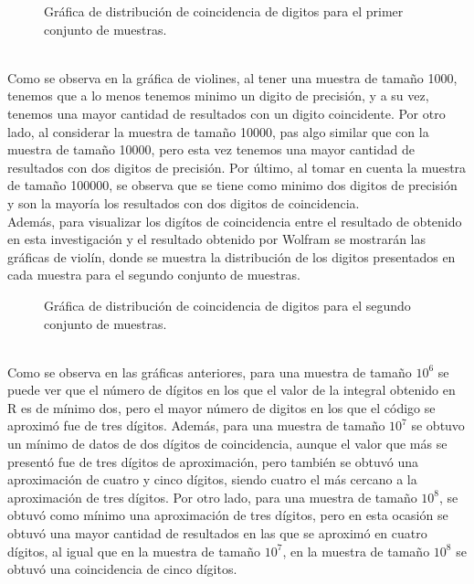 \documentclass{report}
\begin{document}
\newpage

\begin{figure}[htpb]
\centering
{}
\caption{Gráfica de distribución de coincidencia de digitos para el primer conjunto de muestras.}
\end{figure} \\

\noindent Como se observa en la gráfica de violines, al tener una muestra  de tamaño 1000, tenemos que a lo menos tenemos minimo un digito de precisión, y a su vez, tenemos una mayor cantidad de resultados con un digito coincidente. Por otro lado, al considerar la muestra de tamaño 10000, pas algo similar que con la muestra de tamaño 10000, pero esta vez tenemos una mayor cantidad de resultados con dos digitos de precisión. Por último, al tomar en cuenta la muestra de tamaño 100000, se observa que se tiene como minimo dos digitos de precisión y son la mayoría los resultados con dos digitos de coincidencia. \\

\noindent Además, para visualizar los digítos de coincidencia entre el resultado de obtenido en esta investigación y el resultado obtenido por Wolfram se mostrarán las gráficas de violín, donde se muestra la distribución de los digitos presentados en cada muestra para el segundo conjunto de muestras. \\

\newpage

\begin{figure}[htpb]
\centering
{}
\caption{Gráfica de distribución de coincidencia de digitos para el segundo conjunto de muestras.}
\end{figure} \\

\noindent Como se observa en las gráficas anteriores, para una muestra de tamaño $10^{6}$ se puede ver que el número de dígitos en los que el valor de la integral obtenido en R es de mínimo dos, pero el mayor número de digitos en los que el código se aproximó fue de tres dígitos. Además, para una muestra de tamaño $10^{7}$ se obtuvo un mínimo de datos de dos dígitos de coincidencia, aunque el valor que más se presentó fue de tres dígitos de aproximación, pero también se obtuvó una aproximación de cuatro y cinco dígitos, siendo cuatro el más cercano a la aproximación de tres dígitos. Por otro lado, para una muestra de tamaño $10^{8}$, se obtuvó como mínimo una aproximación de tres dígitos, pero en esta ocasión se obtuvó una mayor cantidad de resultados en las que se aproximó en cuatro dígitos, al igual que en la muestra de tamaño $10^{7}$, en la muestra de tamaño $10^{8}$ se obtuvó una coincidencia de cinco dígitos. \\
\end{document}
